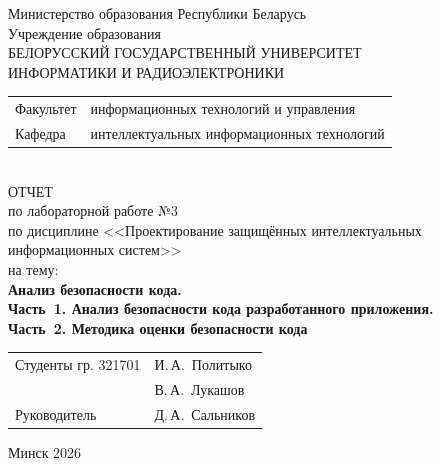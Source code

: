 \begin{titlepage}
	\begin{center}
		Министерство образования Республики Беларусь\\[1em]
		Учреждение образования\\
		БЕЛОРУССКИЙ ГОСУДАРСТВЕННЫЙ УНИВЕРСИТЕТ \\
		ИНФОРМАТИКИ И РАДИОЭЛЕКТРОНИКИ\\[1em]
		
		\begin{minipage}{\textwidth}
			\begin{flushleft}
				\begin{tabular}{ l l }
					Факультет & информационных технологий и управления\\
					Кафедра   & интеллектуальных информационных технологий
				\end{tabular}
			\end{flushleft}
		\end{minipage}\\[1em]
		
		{ОТЧЕТ}\\
		{по лабораторной работе №3}\\
		{по дисциплине <<Проектирование защищённых интеллектуальных}\\
		{информационных систем>>}\\
		{на тему:}\\[1em]
		\textbf{Анализ безопасности кода.}\\[0.4em]
		\textbf{Часть~1. Анализ безопасности кода разработанного приложения.}\\[0.25em]
		\textbf{Часть~2. Методика оценки безопасности кода}\\[1em]
		
		\vspace{2em}
		\begin{tabular}{ p{}p{} }
			Студенты гр. 321701 & И.\,А.~Политыко \\
			& В.\,А.~Лукашов \\
			Руководитель & Д.\,А.~Сальников \\
		\end{tabular}
		
		\vfill
		{\normalsize Минск 2026}
	\end{center}
\end{titlepage}
